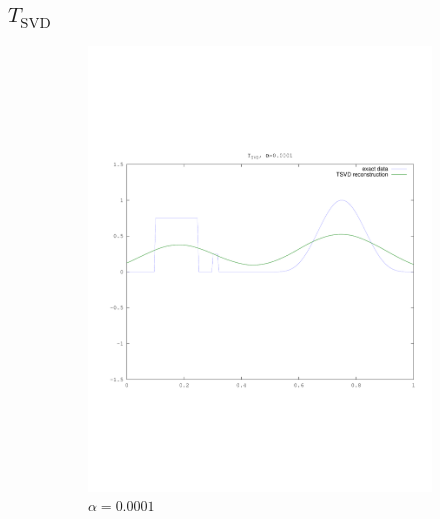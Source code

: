 \documentclass{article}
\begin{document}
\subsection{$T_{\text{SVD}}$}

\begin{figure}[!htb]
        \centering
        \begin{subfigure}[bh]{0.45\textwidth}
                \includegraphics[width=\textwidth]{plots/tsvd0001.pdf}
                \caption{$\alpha=0.0001$}
        \end{subfigure}%
        \begin{subfigure}[bh]{0.45\textwidth}

\end{subfigure}
\end{figure}
\end{document}
